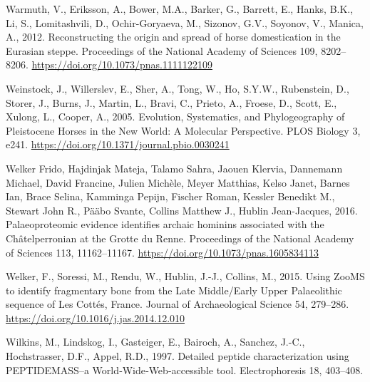 \documentclass[preprint, 3p, authoryear]{elsarticle} %
\newlength{\cslhangindent}
\newlength{\cslentryspacingunit} %
\newenvironment{CSLReferences}[2] %
 {%
  \setlength{\parindent}{0pt}
  \ifodd #1
  \let\oldpar\par
  \def\par{\hangindent=\cslhangindent\oldpar}
  \fi
  \setlength{\parskip}{#2\cslentryspacingunit}
 }%
 {}
\begin{document}
\begin{CSLReferences}{1}{0}
\leavevmode{}%
Warmuth, V., Eriksson, A., Bower, M.A., Barker, G., Barrett, E., Hanks, B.K., Li, S., Lomitashvili, D., Ochir-Goryaeva, M., Sizonov, G.V., Soyonov, V., Manica, A., 2012. Reconstructing the origin and spread of horse domestication in the {Eurasian} steppe. Proceedings of the National Academy of Sciences 109, 8202--8206. \url{https://doi.org/10.1073/pnas.1111122109}

\leavevmode{}%
Weinstock, J., Willerslev, E., Sher, A., Tong, W., Ho, S.Y.W., Rubenstein, D., Storer, J., Burns, J., Martin, L., Bravi, C., Prieto, A., Froese, D., Scott, E., Xulong, L., Cooper, A., 2005. Evolution, {Systematics}, and {Phylogeography} of {Pleistocene Horses} in the {New World}: {A Molecular Perspective}. PLOS Biology 3, e241. \url{https://doi.org/10.1371/journal.pbio.0030241}

\leavevmode{}%
Welker Frido, Hajdinjak Mateja, Talamo Sahra, Jaouen Klervia, Dannemann Michael, David Francine, Julien Michèle, Meyer Matthias, Kelso Janet, Barnes Ian, Brace Selina, Kamminga Pepijn, Fischer Roman, Kessler Benedikt M., Stewart John R., Pääbo Svante, Collins Matthew J., Hublin Jean-Jacques, 2016. Palaeoproteomic evidence identifies archaic hominins associated with the {Châtelperronian} at the {Grotte} du {Renne}. Proceedings of the National Academy of Sciences 113, 11162--11167. \url{https://doi.org/10.1073/pnas.1605834113}

\leavevmode{}%
Welker, F., Soressi, M., Rendu, W., Hublin, J.-J., Collins, M., 2015. Using {ZooMS} to identify fragmentary bone from the {Late Middle}/{Early Upper Palaeolithic} sequence of {Les Cottés}, {France}. Journal of Archaeological Science 54, 279--286. \url{https://doi.org/10.1016/j.jas.2014.12.010}

\leavevmode{}%
Wilkins, M., Lindskog, I., Gasteiger, E., Bairoch, A., Sanchez, J.-C., Hochstrasser, D.F., Appel, R.D., 1997. Detailed peptide characterization using {PEPTIDEMASS}--a {World}‐{Wide}‐{Web}‐accessible tool. Electrophoresis 18, 403--408.

\end{CSLReferences}
\end{document}
